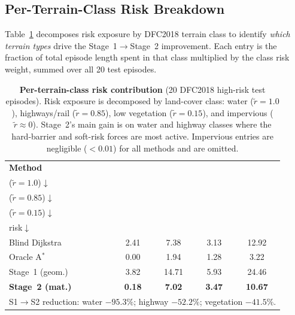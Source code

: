 \subsection{Per-Terrain-Class Risk Breakdown}
\label{subsec:ch6:terrain}

Table~\ref{tab:ch6:terrain} decomposes risk exposure by DFC2018 terrain
class to identify \emph{which terrain types} drive the Stage~1$\to$Stage~2
improvement.
Each entry is the fraction of total episode length spent in that class
multiplied by the class risk weight, summed over all 20 test episodes.

\begin{table}[htbp]
\centering
\caption{%
  \textbf{Per-terrain-class risk contribution} (20 DFC2018 high-risk test
  episodes).
  Risk exposure is decomposed by land-cover class: water ($\tilde r{=}1.0$),
  highways/rail ($\tilde r{=}0.85$), low vegetation ($\tilde r{=}0.15$),
  and impervious ($\tilde r{\approx}0$).
  Stage~2's main gain is on water and highway classes where the hard-barrier
  and soft-risk forces are most active.
  Impervious entries are negligible ($<0.01$) for all methods and are omitted.
}
\label{tab:ch6:terrain}
\small
\setlength{\tabcolsep}{5pt}
\renewcommand{\arraystretch}{1.2}
\begin{tabular}{lcccc}
\toprule
\textbf{Method} &
\makecell{\textbf{Water}\\($\tilde r{=}1.0$)$\downarrow$} &
\makecell{\textbf{Highway/Rail}\\($\tilde r{=}0.85$)$\downarrow$} &
\makecell{\textbf{Low Veg.}\\($\tilde r{=}0.15$)$\downarrow$} &
\makecell{\textbf{Total}\\risk$\downarrow$} \\
\midrule
Blind Dijkstra      & 2.41 & 7.38 & 3.13 & 12.92 \\
Oracle A$^*$        & 0.00 & 1.94 & 1.28 &  3.22 \\
\midrule
Stage~1 (geom.)     & 3.82 & 14.71 & 5.93 & 24.46 \\
\textbf{Stage~2 (mat.)} & \textbf{0.18} & \textbf{7.02} & \textbf{3.47} & \textbf{10.67} \\
\midrule
\multicolumn{5}{l}{\footnotesize
  S1$\to$S2 reduction: water $-95.3\%$;\;
  highway $-52.2\%$;\; vegetation $-41.5\%$.
}\\
\bottomrule
\end{tabular}
\end{table}

